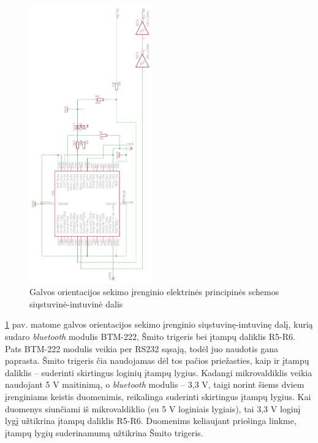 \documentclass[]{vgtuef}
\begin{document}
\begin{figure}[htbp]
  \centering
  \includegraphics[width=200px]{img/head_tracker_sender.png}
  \caption{Galvos orientacijos sekimo įrenginio elektrinės principinės schemos siųstuvinė-imtuvinė dalis}
  \label{fig:headtracker_sender}
\end{figure}

\ref{fig:headtracker_sender} pav. matome galvos orientacijos sekimo įrenginio siųstuvinę-imtuvinę dalį, kurią sudaro \textit{bluetooth} modulis BTM-222, Šmito trigeris bei įtampų daliklis R5-R6. Pats BTM-222 modulis veikia per RS232 sąsają, todėl juo naudotis gana paprasta. Šmito trigeris čia naudojamas dėl tos pačios priežasties, kaip ir įtampų daliklis – suderinti skirtingus loginių įtampų lygius. Kadangi mikrovaldiklis veikia naudojant 5 V maitinimą, o \textit{bluetooth} modulis – 3,3 V, taigi norint šiems dviem įrenginiams keistis duomenimis, reikalinga suderinti skirtingus įtampų lygius. Kai duomenys siunčiami iš mikrovaldiklio (su 5 V loginiais lygiais), tai 3,3 V loginį lygį užtikrina įtampų daliklis R5-R6. Duomenims keliaujant priešinga linkme, įtampų lygių suderinamumą užtikrina Šmito trigeris.
\end{document}

